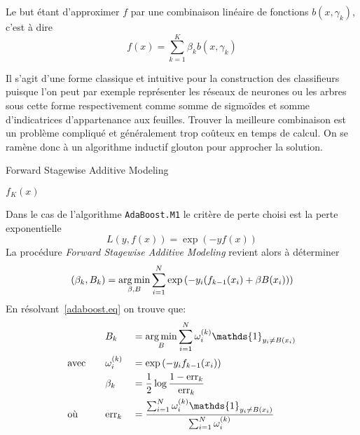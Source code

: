 Le but étant d'approximer $f$ par une combinaison linéaire de fonctions $b(x,\gamma_k)$, c'est à dire
\begin{equation*}
    f(x) = \sum_{k=1}^K \beta_k b(x,\gamma_k)
\end{equation*}

Il s'agit d'une forme classique et intuitive pour la construction des classifieurs puisque l'on peut par exemple représenter les réseaux de neurones ou les arbres sous cette forme respectivement comme somme de sigmoïdes et somme d'indicatrices d'appartenance aux feuilles. Trouver la meilleure combinaison est un problème compliqué et généralement trop coûteux en temps de calcul. On se ramène donc à un algorithme inductif glouton pour approcher la solution.

\begin{algorithm}
\caption{Forward Stagewise Additive Modeling} \label{forward.stagewise}
\begin{algorithmic}
    
    
    \EndFor
    \State \Return $f_K (x)$
    \EndProcedure
\end{algorithmic}    
\end{algorithm}

Dans le cas de l'algorithme \texttt{AdaBoost.M1} le critère de perte choisi est la perte exponentielle
\begin{equation*}
    L( y , f(x) ) = \exp ( -y f(x) )
\end{equation*}
La procédure \emph{Forward Stagewise Additive Modeling} revient alors à déterminer
\begin{equation}
    ( \beta_k , B_k ) = \operatorname*{arg\,min}_{\beta, B} \sum_{i=1}^N \exp \left( - y_i ( f_{k-1} (x_i) + \beta B(x_i) ) \right) \label{adaboost.eq}
\end{equation}
En résolvant~\ref{adaboost.eq} on trouve \citep{Trevor} que:
\begin{alignat*}{3}
    & && B_k &&= \argmin_B \sum_{i=1}^N \omega_i^{(k)} \mathds{1}_{y_i \neq B(x_i) } \\
    &\text{avec} \quad && \omega_i^{(k)} &&= \exp \left( -y_i f_{k-1} (x_i) \right) \\
    & && \beta_k &&= \frac{1}{2} \log \frac{1 - \mathrm{err}_k}{\mathrm{err}_k} \\
    &\text{où} \quad && \mathrm{err}_k &&= \frac{\sum_{i=1}^N \omega_i^{(k)} \mathds{1}_{y_i \neq B(x_i) }}{\sum_{i=1}^N \omega_i^{(k)}}
\end{alignat*}


